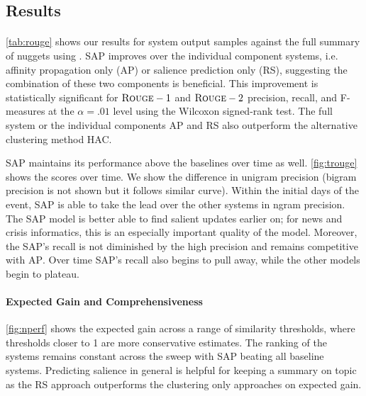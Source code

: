 \subsection{Results}




\paragraph{\rouge} 
\autoref{tab:rouge} shows our results for system output samples against the
full summary of nuggets using \rouge. SAP improves over the individual
component systems, i.e. affinity propagation only (AP) or salience prediction
only (RS), suggesting the combination of these two components is beneficial.
This improvement is statistically significant for $\textsc{Rouge}-1$ and $\textsc{Rouge}-2$
precision, recall, and F-measures at the $\alpha = .01$ level using the
Wilcoxon signed-rank test.  The full system or the individual components AP and
RS also outperform the alternative clustering method HAC. 

SAP maintains its performance above the baselines over time as well.
\autoref{fig:trouge} shows the  scores over time. We show the
difference in unigram precision (bigram precision is not shown but it follows
similar curve). Within the initial days of the event, SAP is able to take the
lead over the other systems in ngram precision. The SAP model is better able to
find salient updates earlier on; for news and crisis informatics, this is an
especially important quality of the model.  Moreover, the SAP's recall is not
diminished by the high precision and remains competitive with \textsc{AP}.
Over time SAP's recall also begins to pull away, while the other models begin
to plateau.



\paragraph{Expected Gain and Comprehensiveness}
\autoref{fig:nperf} shows the expected gain across a range of similarity
thresholds, where thresholds closer to 1 are more conservative estimates.  The
ranking of the systems remains constant across the sweep with \textsc{SAP}
beating all baseline systems. Predicting salience in general is helpful for
keeping a summary on topic as the \textsc{RS} approach outperforms the
clustering only approaches on expected gain.

